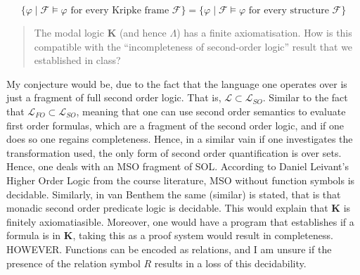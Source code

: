 \documentclass[11pt,a4paper]{article}
\begin{document}
\begin{equation*}
\{ \varphi \mid \mathcal{F}\models \varphi \text{ for every Kripke frame } \mathcal{F} \} =
\{ \varphi \mid \mathcal{F}\models \varphi \text{ for every structure }  \mathcal{F} \} 
\end{equation*}



\begin{quote}
The modal logic $\mathbf{K}$ (and hence $\Lambda$) has a finite axiomatisation. How is this compatible with the “incompleteness of second-order logic” result that we established in
class?
\end{quote}


My conjecture would be, due to the fact that the language one operates over is just a fragment of full second order logic. That is, $\mathcal{L} \subset \mathcal{L}_{SO}$. Similar to the fact that $\mathcal{L}_{FO} \subset \mathcal{L}_{SO}$, meaning that one can use second order semantics to evaluate first order formulas, which are a fragment of the second order logic, and if one does so one regains completeness. Hence, in a similar vain if one investigates the transformation used, the only form of second order quantification is over sets. 
Hence, one deals with an MSO fragment of SOL. According to Daniel Leivant's Higher Order Logic from the course literature, MSO without function symbols is decidable. Similarly, in van Benthem  the same (similar) is stated, that is that monadic second order  predicate logic is decidable. This would explain that $\mathbf{K}$ is finitely axiomatiasible. Moreover, one would have a program that establishes if a formula is in $\mathbf{K}$, taking this as a proof system would result in completeness. HOWEVER. Functions can be encoded as relations, and I am unsure if the presence of the relation symbol $R$ results in a loss of this decidability. 
\end{document}
